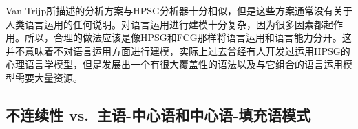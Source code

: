 
Van Trijp所描述的分析方案与HPSG分析器十分相似，但是这些方案通常没有关于人类语言运用的任何说明。对语言运用进行建模十分复杂，因为很多因素都起作用。所以，合理的做法应该是像HPSG和FCG那样将语言运用和语言能力分开。这并不意味着不对语言运用方面进行建模，实际上过去曾经有人开发过运用HPSG的心理语言学模型\citep{Konieczny96a-u}，但是发展出一个有很大覆盖性的语法以及与它组合的语言运用模型需要大量资源。

\subsection{不连续性 vs.\ 主语-中心语和中心语-填充语模式}

